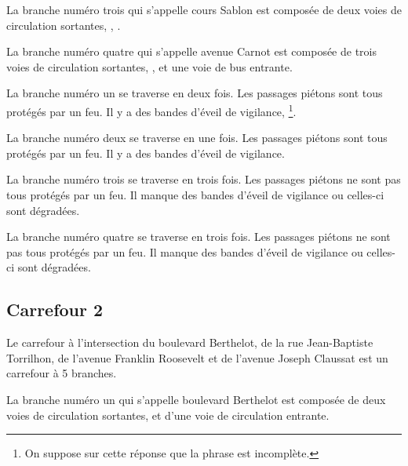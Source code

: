 \begin{appendix}
\newpar{}

La branche numéro trois qui s'appelle cours Sablon est composée de deux voies de circulation sortantes, , .

\newpar{}

La branche numéro quatre qui s'appelle avenue Carnot est composée de trois voies de circulation sortantes, , et une voie de bus entrante.

\newpar{}

La branche numéro un se traverse en deux fois. Les passages piétons sont tous protégés par un feu. Il y a des bandes d'éveil de vigilance, \footnote{On suppose sur cette réponse que la phrase est incomplète.}.

\newpar{}

La branche numéro deux se traverse en une fois. Les passages piétons sont tous protégés par un feu. Il y a des bandes d'éveil de vigilance.

\newpar{}

La branche numéro trois se traverse en trois fois. Les passages piétons ne sont pas tous protégés par un feu. Il manque des bandes d'éveil de vigilance ou celles-ci sont dégradées.

\newpar{}

La branche numéro quatre se traverse en trois fois. Les passages piétons ne sont pas tous protégés par un feu. Il manque des bandes d'éveil de vigilance ou celles-ci sont dégradées.

\subsection*{Carrefour 2}

\label{annexe:q_ID39_carrefour2}

Le carrefour à l'intersection du boulevard Berthelot, de la rue Jean-Baptiste Torrilhon, de l'avenue Franklin Roosevelt et de l'avenue Joseph Claussat est un carrefour à 5 branches.

\newpar{}

La branche numéro un qui s'appelle boulevard Berthelot est composée de deux voies de circulation sortantes, et d'une voie de circulation entrante.

\newpar{}


\end{appendix}
